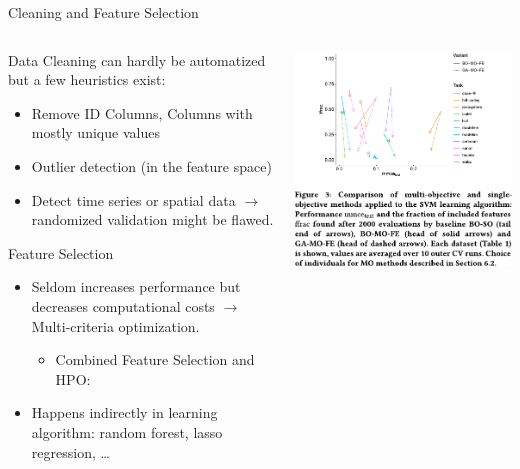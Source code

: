 \begin{frame}{Cleaning and Feature Selection}
    \begin{columns}
      \begin{column}{0.7\textwidth}

        Data Cleaning can hardly be automatized but a few heuristics exist:
        \begin{itemize}
          \item Remove ID Columns, Columns with mostly unique values
          \item Outlier detection (in the feature space)
          \item Detect time series or spatial data $\rightarrow$ randomized validation might be flawed.
        \end{itemize}

        Feature Selection
        \begin{itemize}
          \item Seldom increases performance but decreases computational costs $\rightarrow$ Multi-criteria optimization.
          \begin{itemize}
            \item Combined Feature Selection and HPO: 
          \end{itemize}
          \item Happens indirectly in learning algorithm: random forest, lasso regression, \ldots %
        \end{itemize}
      \end{column}%
      \begin{column}{0.3\textwidth}
        \begin{center}
          \includegraphics[width = \linewidth]{images/Binder2020multiobjective_fig3.pdf}


\end{center}
\end{column}
\end{columns}
\end{frame}
